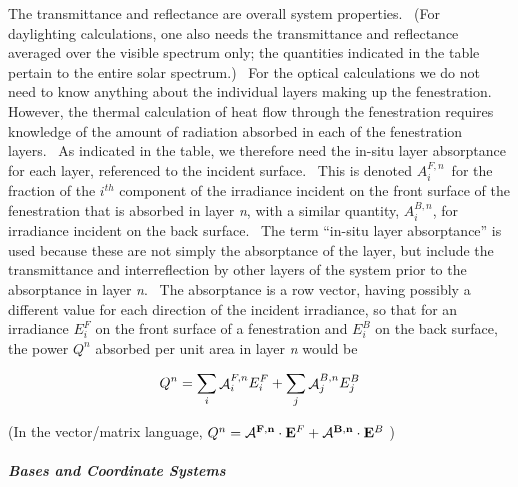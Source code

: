 The transmittance and reflectance are overall system properties.~ (For daylighting calculations, one also needs the transmittance and reflectance averaged over the visible spectrum only; the quantities indicated in the table pertain to the entire solar spectrum.)~ For the optical calculations we do not need to know anything about the individual layers making up the fenestration.~ However, the thermal calculation of heat flow through the fenestration requires knowledge of the amount of radiation absorbed in each of the fenestration layers.~ As indicated in the table, we therefore need the in-situ layer absorptance for each layer, referenced to the incident surface.~ This is denoted $A_i^{F,n}$~for the fraction of the $i^{th}$ component of the irradiance incident on the front surface of the fenestration that is absorbed in layer \emph{n}, with a similar quantity, $A_i^{B,n}$, for irradiance incident on the back surface.~ The term ``in-situ layer absorptance'' is used because these are not simply the absorptance of the layer, but include the transmittance and interreflection by other layers of the system prior to the absorptance in layer \emph{n}.~ The absorptance is a row vector, having possibly a different value for each direction of the incident irradiance, so that for an irradiance $E_{i}^{F}$ on the front surface of a fenestration and $E_{i}^{B}$ on the back surface, the power $Q^{n}$ absorbed per unit area in layer \emph{n} would be

\begin{equation}
{Q^n} = \sum\limits_i {{\mathop{\rm \mathcal{A}}\nolimits}_i^{F,n}E_i^F}  + \sum\limits_j {{\mathop{\rm \mathcal{A}}\nolimits}_j^{B,n}E_j^B}
\label{eq:QnVectorMatrixEquation}
\end{equation}

(In the vector/matrix language, \({Q^n} = {\bf{\mathcal{A}}^{F,n}} \cdot {{\bf{E}}^F} + {\bf{\mathcal{A}}^{B,n}} \cdot {{\bf{E}}^B}\) )

\subparagraph{Bases and Coordinate Systems}\label{bases-and-coordinate-systems}

